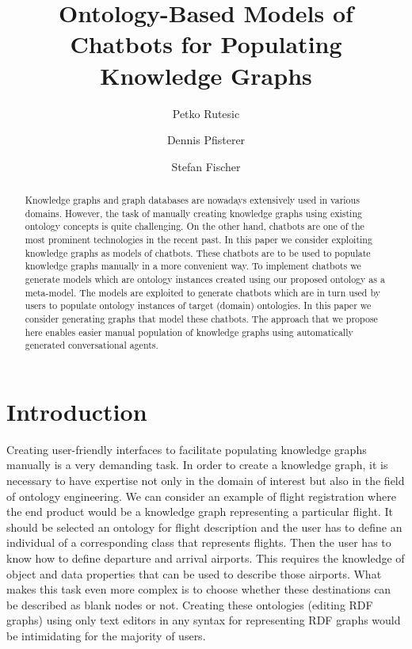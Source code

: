 \documentclass[runningheads]{llncs}
\begin{document}
%
\title{Ontology-Based Models of Chatbots for Populating Knowledge Graphs}
%
%
\author{Petko Rutesic \and
Dennis Pfisterer \and
Stefan Fischer}

%
%
%
\maketitle              %
%
\begin{abstract}
Knowledge graphs and graph databases are nowadays extensively used in various domains. However, the task of manually creating knowledge graphs using existing ontology concepts is quite challenging.  On the other hand, chatbots are one of the most prominent technologies in the recent past. In this paper we consider exploiting knowledge graphs as models of chatbots. These chatbots are to be used to populate knowledge graphs manually in a more convenient way. To implement chatbots we generate models which are ontology instances created using our proposed ontology as a meta-model. The models are exploited to generate chatbots which are in turn used by users to populate ontology instances of target (domain) ontologies. In this paper we consider generating graphs that model these chatbots. The approach that we propose here enables easier manual population of knowledge graphs using automatically generated conversational agents.
\end{abstract}
%
%
%
\section{Introduction}

Creating user-friendly interfaces to facilitate populating knowledge graphs manually is a very demanding task. In order to create a knowledge graph, it is necessary to have expertise not only in the domain of interest but also in the field of ontology engineering. We can consider an example of flight registration where the end product would be a knowledge graph representing a particular flight. It should be selected an ontology for flight description and the user has to define an individual of a corresponding class that represents flights. Then the user has to know how to define departure and arrival airports. This requires the knowledge of object and data properties that can be used to describe those airports. What makes this task even more complex is to choose whether these destinations can be described as blank nodes or not. Creating these ontologies (editing RDF graphs) using only text editors in any syntax for representing RDF graphs would be intimidating for the majority of users.
\end{document}

